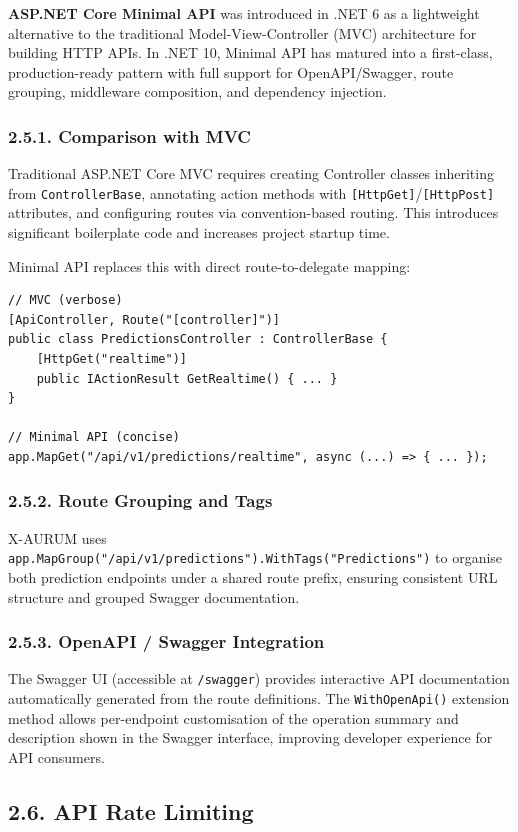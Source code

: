 \textbf{ASP.NET Core Minimal API} was introduced in .NET 6 as a lightweight alternative to the traditional Model-View-Controller (MVC) architecture for building HTTP APIs. In .NET 10, Minimal API has matured into a first-class, production-ready pattern with full support for OpenAPI/Swagger, route grouping, middleware composition, and dependency injection.

\subsubsection{2.5.1. Comparison with MVC}
Traditional ASP.NET Core MVC requires creating Controller classes inheriting from \texttt{ControllerBase}, annotating action methods with \texttt{[HttpGet]}/\texttt{[HttpPost]} attributes, and configuring routes via convention-based routing. This introduces significant boilerplate code and increases project startup time.

Minimal API replaces this with direct route-to-delegate mapping:
\begin{lstlisting}
// MVC (verbose)
[ApiController, Route("[controller]")]
public class PredictionsController : ControllerBase {
    [HttpGet("realtime")]
    public IActionResult GetRealtime() { ... }
}

// Minimal API (concise)
app.MapGet("/api/v1/predictions/realtime", async (...) => { ... });
\end{lstlisting}

\subsubsection{2.5.2. Route Grouping and Tags}
X-AURUM uses \texttt{app.MapGroup("/api/v1/predictions").WithTags("Predictions")} to organise both prediction endpoints under a shared route prefix, ensuring consistent URL structure and grouped Swagger documentation.

\subsubsection{2.5.3. OpenAPI / Swagger Integration}
The Swagger UI (accessible at \texttt{/swagger}) provides interactive API documentation automatically generated from the route definitions. The \texttt{WithOpenApi()} extension method allows per-endpoint customisation of the operation summary and description shown in the Swagger interface, improving developer experience for API consumers.

\subsection{2.6. API Rate Limiting}

